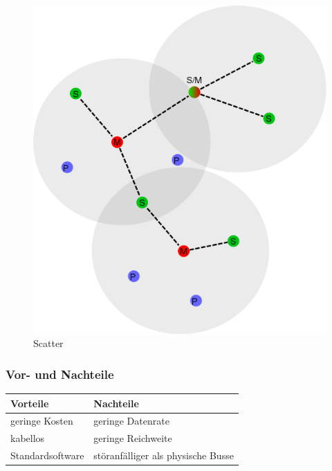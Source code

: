     \begin{figure}[h!]
        \centering
        \includegraphics[width=0.5\linewidth]{pico_scatternet.png}
        \caption[de.wikipedia.org/wiki/Scatternet{\#}/\\media/Datei:BluetoothScatternet-de.svg]{Scatter}
    \end{figure}
    
    \subsubsection{Vor- und Nachteile}
    \begin{center}
    \begin{tabular}{l|l}
        \textbf{Vorteile} & \textbf{Nachteile}\\
        \hline geringe Kosten & geringe Datenrate\\
        \hline kabellos & geringe Reichweite\\
        \hline Standardsoftware & störanfälliger als physische Busse\\
    \end{tabular}
\end{center}
